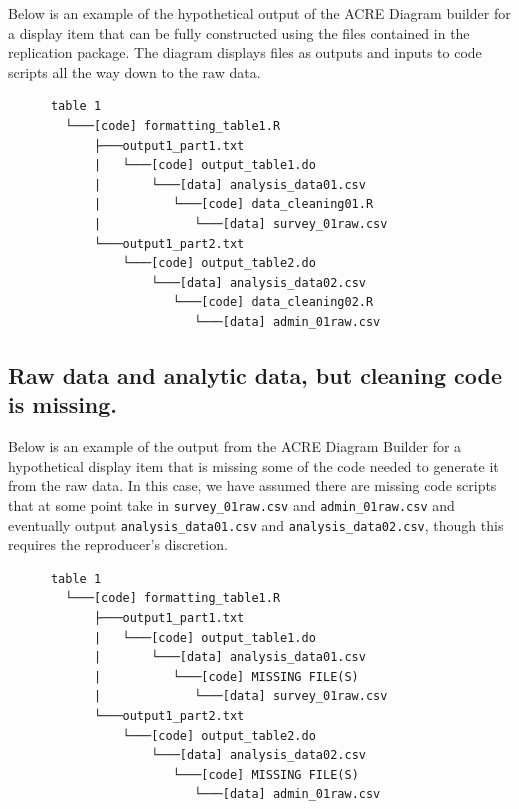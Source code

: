 \documentclass[]{book}
\begin{document}
Below is an example of the hypothetical output of the ACRE Diagram builder for a display item that can be fully constructed using the files contained in the replication package. The diagram displays files as outputs and inputs to code scripts all the way down to the raw data.

\begin{verbatim}
      table 1
        └───[code] formatting_table1.R
            ├───output1_part1.txt  
            |   └───[code] output_table1.do           
            |       └───[data] analysis_data01.csv
            |          └───[code] data_cleaning01.R
            |             └───[data] survey_01raw.csv
            └───output1_part2.txt  
                └───[code] output_table2.do           
                    └───[data] analysis_data02.csv
                       └───[code] data_cleaning02.R
                          └───[data] admin_01raw.csv  
\end{verbatim}

\hypertarget{raw-data-and-analytic-data-but-cleaning-code-is-missing.}{%
\subsection{Raw data and analytic data, but cleaning code is missing.}\label{raw-data-and-analytic-data-but-cleaning-code-is-missing.}}

Below is an example of the output from the ACRE Diagram Builder for a hypothetical display item that is missing some of the code needed to generate it from the raw data. In this case, we have assumed there are missing code scripts that at some point take in \texttt{survey\_01raw.csv} and \texttt{admin\_01raw.csv} and eventually output \texttt{analysis\_data01.csv} and \texttt{analysis\_data02.csv}, though this requires the reproducer's discretion.

\begin{verbatim}
      table 1
        └───[code] formatting_table1.R
            ├───output1_part1.txt  
            |   └───[code] output_table1.do           
            |       └───[data] analysis_data01.csv
            |          └───[code] MISSING FILE(S)
            |             └───[data] survey_01raw.csv
            └───output1_part2.txt  
                └───[code] output_table2.do           
                    └───[data] analysis_data02.csv
                       └───[code] MISSING FILE(S)
                          └───[data] admin_01raw.csv  
\end{verbatim}
\end{document}
